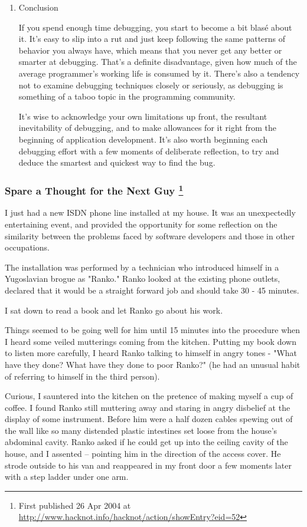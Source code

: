 \documentclass{article}
\begin{document}
\begin{enumerate}
\item Conclusion
\label{sec:orgheadline335}

If you spend enough time debugging, you start to become a bit blasé
about it. It's easy to slip into a rut and just keep following the same
patterns of behavior you always have, which means that you never get any
better or smarter at debugging. That's a definite disadvantage, given
how much of the average programmer's working life is consumed by it.
There's also a tendency not to examine debugging techniques closely or
seriously, as debugging is something of a taboo topic in the programming
community.

It's wise to acknowledge your own limitations up front, the resultant
inevitability of debugging, and to make allowances for it right from the
beginning of application development. It's also worth beginning each
debugging effort with a few moments of deliberate reflection, to try and
deduce the smartest and quickest way to find the bug.
\end{enumerate}

\subsubsection{Spare a Thought for the Next Guy \footnote{First published 26 Apr 2004 at
\url{http://www.hacknot.info/hacknot/action/showEntry?eid=52}}}
\label{sec:orgheadline337}

I just had a new ISDN phone line installed at my house. It was an
unexpectedly entertaining event, and provided the opportunity for some
reflection on the similarity between the problems faced by software
developers and those in other occupations.

The installation was performed by a technician who introduced himself in
a Yugoslavian brogue as "Ranko." Ranko looked at the existing phone
outlets, declared that it would be a straight forward job and should
take 30 - 45 minutes.

I sat down to read a book and let Ranko go about his work.

Things seemed to be going well for him until 15 minutes into the
procedure when I heard some veiled mutterings coming from the kitchen.
Putting my book down to listen more carefully, I heard Ranko talking to
himself in angry tones - "What have they done? What have they done to
poor Ranko?" (he had an unusual habit of referring to himself in the
third person).

Curious, I sauntered into the kitchen on the pretence of making myself a
cup of coffee. I found Ranko still muttering away and staring in angry
disbelief at the display of some instrument. Before him were a half
dozen cables spewing out of the wall like so many distended plastic
intestines set loose from the house's abdominal cavity. Ranko asked if
he could get up into the ceiling cavity of the house, and I assented --
pointing him in the direction of the access cover. He strode outside to
his van and reappeared in my front door a few moments later with a step
ladder under one arm.
\end{document}
